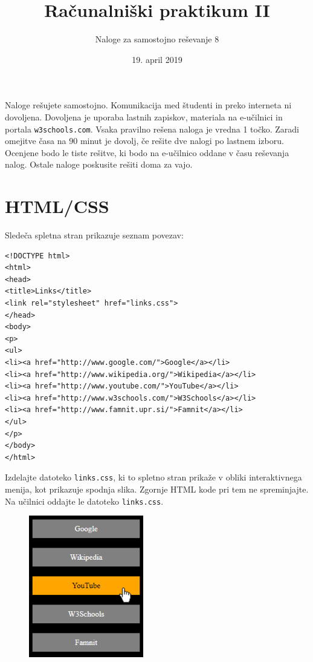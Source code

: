 \documentclass[a4paper,12pt]{article}
\title{Računalniški praktikum II}
\author{Naloge za samostojno reševanje 8}
\date{19. april 2019}
\begin{document}
\maketitle
\thispagestyle{empty}

\vspace{2cm}
\noindent
Naloge rešujete samostojno. Komunikacija med študenti in preko interneta ni dovoljena. Dovoljena je uporaba lastnih zapiskov, materiala na e-učilnici in portala \texttt{w3schools.com}. Vsaka pravilno rešena naloga je vredna 1 točko. Zaradi omejitve časa na $90$ minut je dovolj, če rešite dve nalogi po lastnem izboru. Ocenjene bodo le tiste rešitve, ki bodo na e-učilnico oddane v času reševanja nalog. Ostale naloge poskusite rešiti doma za vajo.

\newpage

\section{HTML/CSS}
\noindent
Sledeča spletna stran prikazuje seznam povezav:

{\footnotesize
\begin{verbatim}
<!DOCTYPE html>
<html>
<head>
<title>Links</title>
<link rel="stylesheet" href="links.css">
</head>
<body>
<p>
<ul>
<li><a href="http://www.google.com/">Google</a></li>
<li><a href="http://www.wikipedia.org/">Wikipedia</a></li>
<li><a href="http://www.youtube.com/">YouTube</a></li>
<li><a href="http://www.w3schools.com/">W3Schools</a></li>
<li><a href="http://www.famnit.upr.si/">Famnit</a></li>
</ul>
</p>
</body>
</html>
\end{verbatim}
}

\noindent
Izdelajte datoteko \texttt{links.css}, ki to spletno stran prikaže v obliki interaktivnega menija, kot prikazuje spodnja slika. Zgornje HTML kode pri tem ne spreminjajte. Na učilnici oddajte le datoteko \texttt{links.css}.

\bigskip
\begin{figure}[h]
\centering
\includegraphics[width=5cm]{menu.png}
\end{figure}
\end{document}

